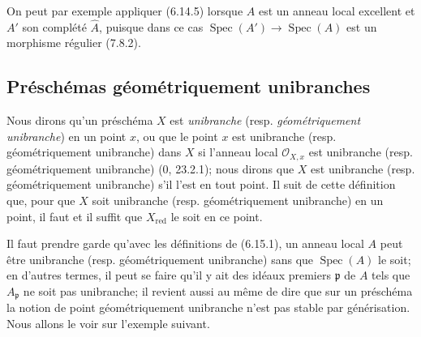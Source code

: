 On peut par exemple appliquer (6.14.5) lorsque $A$ est un anneau local
excellent et $A'$ son complété $\widehat A$, puisque dans ce cas
$\operatorname{Spec}(A')\to\operatorname{Spec}(A)$ est un morphisme
régulier (7.8.2).

\subsection{Préschémas géométriquement unibranches}
\label{IV.2.s6.15-fr}

\begin{env}[6.15.1]
\label{IV.2.s6.15.1-fr}
Nous dirons qu'un préschéma $X$ est \emph{unibranche} (resp.
\emph{géométriquement unibranche}) en un point $x$, ou que le point $x$
est unibranche (resp. géométriquement unibranche) dans $X$ si l'anneau
local $\mathcal O_{X,x}$ est unibranche (resp. géométriquement
unibranche) (0, 23.2.1); nous dirons que $X$ est unibranche (resp.
géométriquement unibranche) s'il l'est en tout point. Il suit de cette
définition que, pour que $X$ soit unibranche (resp. géométriquement
unibranche) en un point, il faut et il suffit que $X_{\mathrm{red}}$ le soit
en ce point.
\end{env}

\begin{env}[6.15.2]
\label{IV.2.s6.15.2-fr}
Il faut prendre garde qu'avec les définitions de (6.15.1), un anneau local
$A$ peut être unibranche (resp. géométriquement unibranche) sans que
$\operatorname{Spec}(A)$ le soit; en d'autres termes, il peut se faire qu'il
y ait des idéaux premiers $\mathfrak p$ de $A$ tels que $A_\mathfrak p$ ne
soit pas unibranche; il revient aussi au même de dire que sur un préschéma
la notion de point géométriquement unibranche n'est pas stable par
générisation. Nous allons le voir sur l'exemple suivant.
\end{env}

